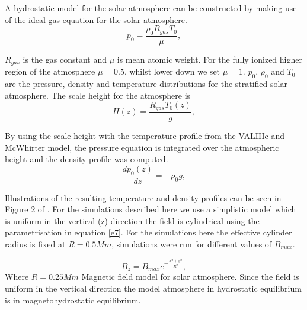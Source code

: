 \documentclass{aastex62}
\begin{document}
A hydrostatic model for the solar atmosphere can be constructed by making use of the ideal gas equation for the solar atmosphere.
\begin{equation}
p_{0}=\frac{\rho_{0}R_{gas}T_{0}}{\mu}  , \label{e8}
\end{equation}

$R_{gas}$ is the gas constant and $\mu$ is mean atomic weight. For the fully ionized higher region of the atmosphere $\mu=0.5$, whilst lower down we set $\mu=1$. $p_{0}$, $\rho_{0}$ and $T_{0}$ are the pressure, density and temperature distributions for the stratified solar atmosphere. The scale height for the atmosphere is
\begin{equation}
H(z)=\frac{R_{gas}T_{0}(z)}{g}  , \label{e10}
\end{equation}

By using the scale height with the temperature profile from the VALIIIc and McWhirter model, the pressure equation is integrated over the atmospheric height and the density profile was computed.
\begin{equation}
\frac{dp_{0}(z)}{dz}=-\rho_{0}g   , \label{e9}
\end{equation}

Illustrations of the resulting temperature and density profiles can be seen in Figure 2 of \citet{Griffiths2018}. For the simulations described here we use a simplistic model which is uniform in the vertical (z) direction the field is cylindrical using the parametrisation in equation \ref{e7}. For the simulations here the effective cylinder radius is fixed at $R=0.5Mm$, simulations were run for different values of $B_{max}$.




\begin{equation}
B_{z}=B_{max} e^{-\frac{x^2+y^2}{R^2}} , \label{e7}
\end{equation}
Where $R=0.25Mm$
Magnetic field model for solar atmosphere. Since the field is uniform in the vertical direction the model atmosphere in hydrostatic equilibrium is in magnetohydrostatic equilibrium.
\end{document}
